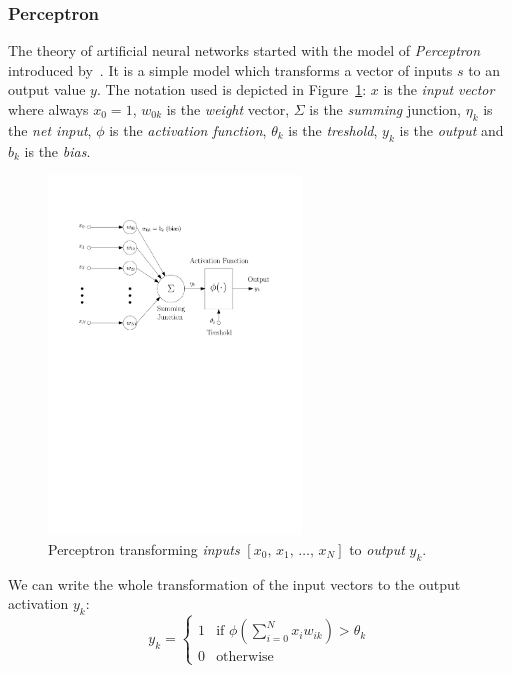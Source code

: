 \subsubsection{Perceptron}
\label{sec:models-perceptron}

The theory of artificial neural networks started with the model of \emph{Perceptron} introduced by~\citet{mcculloch1943logical}. It is a simple model which transforms a vector of inputs $s$ to an output value $y$. The notation used is depicted in Figure~\ref{fig:perceptron}: $x$ is the \emph{input vector} where always $x_0=1$, $w_{0k}$ is the \emph{weight} vector, $\Sigma$ is the \emph{summing} junction, $\eta_k$ is the \emph{net input}, $\phi$ is the \emph{activation function}, $\theta_k$ is the \emph{treshold}, $y_k$ is the \emph{output} and $b_k$ is the \emph{bias}.

\begin{figure}[H]
  \centering
  \includegraphics[width=0.6\textwidth]{img/perceptron.pdf}    
  \caption{Perceptron transforming \emph{inputs} $[x_0,\, x_1,\, \ldots,\, x_N]$ to \emph{output} $y_k$.} 
  \label{fig:perceptron}
\end{figure}

We can write the whole transformation of the input vectors to the output activation $y_k$: 
\begin{equation}
\label{eq:perceptron} 
y_k =
\left\{
	\begin{array}{ll}
		1 & \mbox{if } \phi(\sum_{i=0}^N x_iw_{ik}) > \theta_k \\
		0 & \mbox{otherwise}
	\end{array}
\right.
\end{equation} 

